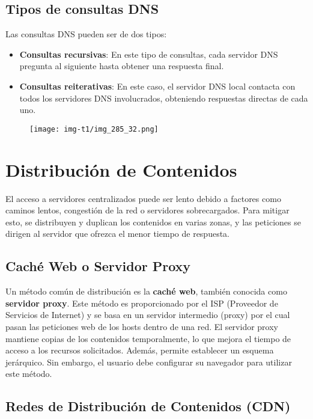 \documentclass{article}
\begin{document}
\subsection{Tipos de consultas DNS}

Las consultas DNS pueden ser de dos tipos:

\begin{itemize}
    \item \textbf{Consultas recursivas}: En este tipo de consultas, cada servidor DNS pregunta al siguiente hasta obtener una respuesta final.
    \item \textbf{Consultas reiterativas}: En este caso, el servidor DNS local contacta con todos los servidores DNS involucrados, obteniendo respuestas directas de cada uno.
\end{itemize}

\begin{figure}[h]
    \centering
    \texttt{[image: img-t1/img\_285\_32.png]}
\end{figure}

\section{Distribución de Contenidos}

El acceso a servidores centralizados puede ser lento debido a factores como caminos lentos, congestión de la red o servidores sobrecargados. Para mitigar esto, se distribuyen y duplican los contenidos en varias zonas, y las peticiones se dirigen al servidor que ofrezca el menor tiempo de respuesta.

\subsection{Caché Web o Servidor Proxy}

Un método común de distribución es la \textbf{caché web}, también conocida como \textbf{servidor proxy}. Este método es proporcionado por el ISP (Proveedor de Servicios de Internet) y se basa en un servidor intermedio (proxy) por el cual pasan las peticiones web de los hosts dentro de una red. El servidor proxy mantiene copias de los contenidos temporalmente, lo que mejora el tiempo de acceso a los recursos solicitados. Además, permite establecer un esquema jerárquico. Sin embargo, el usuario debe configurar su navegador para utilizar este método.

\subsection{Redes de Distribución de Contenidos (CDN)}
\end{document}

